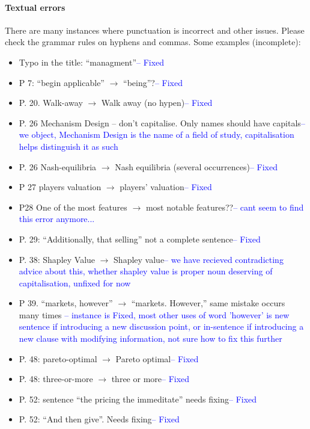 \documentclass{article}
\begin{document}
\paragraph{Textual errors}
There are many instances where punctuation is incorrect and other issues. Please check the
grammar rules on hyphens and commas. Some examples (incomplete):
\begin{itemize}
\item	Typo in the title: “managment”\textcolor{blue}{-- Fixed}
\item	P 7: “begin applicable” $\rightarrow$ “being”?\textcolor{blue}{-- Fixed}
\item	P. 20. Walk-away $\rightarrow$ Walk away (no hypen)\textcolor{blue}{-- Fixed}
\item	P. 26 Mechanism Design – don’t capitalise. Only names should have capitals\textcolor{blue}{-- we object, Mechanism Design is the name of a field of study, capitalisation helps distinguish it as such}
\item	P. 26 Nash-equilibria $\rightarrow$ Nash equilibria (several occurrences)\textcolor{blue}{-- Fixed}
\item	P 27 players valuation $\rightarrow$ players’ valuation\textcolor{blue}{-- Fixed}
\item	P28 One of the most features $\rightarrow$ most notable features??\textcolor{blue}{-- cant seem to find this error anymore...}
\item	P. 29: “Additionally, that selling” not a complete sentence\textcolor{blue}{-- Fixed}
\item	P. 38: Shapley Value $\rightarrow$ Shapley value\textcolor{blue}{-- we have recieved contradicting advice about this, whether shapley value is proper noun deserving of capitalisation, unfixed for now}
\item	P 39. “markets, however” $\rightarrow$ “markets. However,” same mistake occurs many times \textcolor{blue}{-- instance is Fixed, most other uses of word 'however' is new sentence if introducing a new discussion point, or in-sentence if introducing a new clause with modifying information, not sure how to fix this further}
\item	P. 48: pareto-optimal $\rightarrow$ Pareto optimal\textcolor{blue}{-- Fixed}
\item	P. 48: three-or-more $\rightarrow$ three or more\textcolor{blue}{-- Fixed}
\item	P. 52: sentence “the pricing the immeditate” needs fixing\textcolor{blue}{-- Fixed}
\item	P. 52: “And then give”. Needs fixing\textcolor{blue}{-- Fixed}

\end{itemize}
\end{document}
